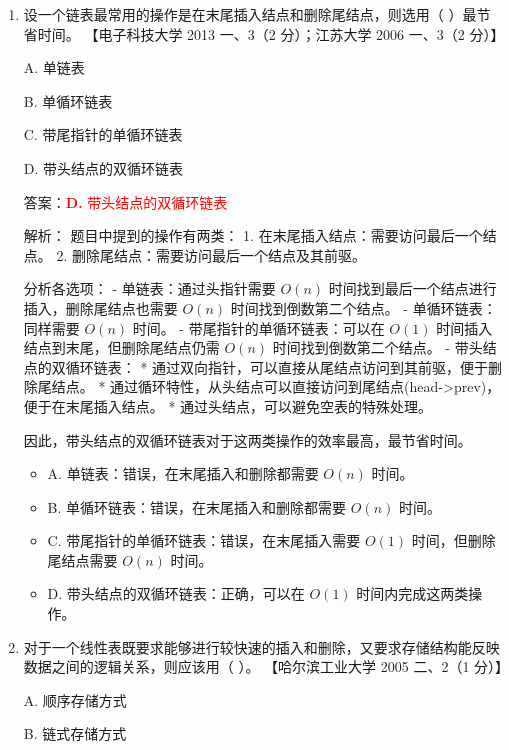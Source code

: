\documentclass[lang=cn,newtx,10pt,scheme=chinese]{../../../elegantbook}
\begin{document}
\begin{enumerate}
        \item 设一个链表最常用的操作是在末尾插入结点和删除尾结点，则选用（ ）最节省时间。  
        【电子科技大学 2013 一、3（2 分）；江苏大学 2006 一、3（2 分）】  
    
        A. 单链表  
    
        B. 单循环链表  
    
        C. 带尾指针的单循环链表  
    
        D. 带头结点的双循环链表  
    
        答案：\textcolor{red}{\textbf{D.} 带头结点的双循环链表}

        解析：
        题目中提到的操作有两类：
        1. 在末尾插入结点：需要访问最后一个结点。
        2. 删除尾结点：需要访问最后一个结点及其前驱。

        分析各选项：
        - 单链表：通过头指针需要 $O(n)$ 时间找到最后一个结点进行插入，删除尾结点也需要 $O(n)$ 时间找到倒数第二个结点。
        - 单循环链表：同样需要 $O(n)$ 时间。
        - 带尾指针的单循环链表：可以在 $O(1)$ 时间插入结点到末尾，但删除尾结点仍需 $O(n)$ 时间找到倒数第二个结点。
        - 带头结点的双循环链表：
          * 通过双向指针，可以直接从尾结点访问到其前驱，便于删除尾结点。
          * 通过循环特性，从头结点可以直接访问到尾结点(head->prev)，便于在末尾插入结点。
          * 通过头结点，可以避免空表的特殊处理。

        因此，带头结点的双循环链表对于这两类操作的效率最高，最节省时间。

        \begin{itemize}
            \item A. 单链表：错误，在末尾插入和删除都需要 $O(n)$ 时间。
            \item B. 单循环链表：错误，在末尾插入和删除都需要 $O(n)$ 时间。
            \item C. 带尾指针的单循环链表：错误，在末尾插入需要 $O(1)$ 时间，但删除尾结点需要 $O(n)$ 时间。
            \item D. 带头结点的双循环链表：正确，可以在 $O(1)$ 时间内完成这两类操作。
        \end{itemize}
    
        \item 对于一个线性表既要求能够进行较快速的插入和删除，又要求存储结构能反映数据之间的逻辑关系，则应该用（ ）。  
        【哈尔滨工业大学 2005 二、2（1 分）】
    
        A. 顺序存储方式  
    
        B. 链式存储方式
    

\end{enumerate}
\end{document}
